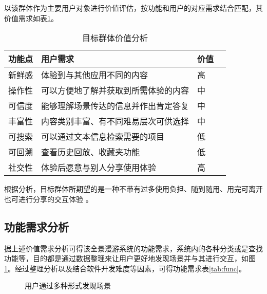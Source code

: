 以该群体作为主要用户对象进行价值评估，按功能和用户的对应需求结合匹配，其价值需求如表\ref{tab:value}。

\begin{table}[htbp]
\centering
\caption{目标群体价值分析}
\vskip 5pt
\begin{tabular}{llll}
\toprule
功能点 & 用户需求 & 价值 \\
\midrule
新鲜感 & 体验到与其他应用不同的内容 & 高 \\
操作性 & 可以方便地了解并获取到所需体验的内容 & 中 \\
可信度 & 能够理解场景传达的信息并作出肯定答复 & 中 \\
丰富性 & 内容类别丰富、有不同难易层次可供选择 & 中 \\
可搜索 & 可以通过文本信息检索需要的项目 & 低 \\
可回溯 & 查看历史回放、收藏夹功能 & 低 \\
社交性 & 体验后愿意与别人分享使用体验 & 高 \\
\bottomrule
\end{tabular}
\label{tab:value}
\end{table}

根据分析，目标群体所期望的是一种不带有过多使用负担、随到随用、用完可离开也可进行分享的交互体验
。

\subsection{功能需求分析}
据上述价值需求分析可得该全景漫游系统的功能需求，系统内的各种分类或是查找功能等，目的都是通过数据整理来让用户更好地发现场景并与其进行交互，如图\ref{fig:interaction}。经过整理分析以及结合软件开发难度等因素，可得功能需求表\ref{tab:func}。

\begin{figure}[htp]
\centering
{}
\caption{用户通过多种形式发现场景}
\label{fig:interaction}
\end{figure}


